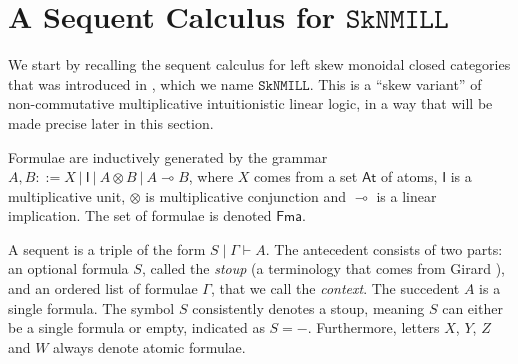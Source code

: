 \documentclass[sn-mathphys-num]{sn-jnl}%
\newcommand{\vd}{\vdash}
\newcommand{\ot}{\otimes}
\newcommand{\lolli}{\multimap}
\newcommand{\unit}{\mathsf{I}}
\newcommand{\SkNMILL}{$\mathtt{SkNMILL}$}
\newcommand{\SkBiCT}{$\mathtt{SkBiCT}$}
\newcommand{\SkBiCA}{$\mathtt{SkBiCA}$}
\newcommand{\mf}[1]{\mathsf{#1}}
\theoremstyle{thmstyleone}%
\theoremstyle{thmstyletwo}%
\theoremstyle{thmstylethree}%
\begin{document}

\section{A Sequent Calculus for \SkNMILL}\label{sec:syntax}
We start by recalling the sequent calculus for left skew monoidal closed categories that was introduced in \cite{UVW:protsn}, which we name \SkNMILL. This is a ``skew variant'' of non-commutative multiplicative intuitionistic linear logic, in a way that will be made precise later in this section.

Formulae are inductively generated by the grammar $A, B::= X \ | \ \unit \ | \ A \ot B \ | \ A \lolli B$, where $X$ comes from a set $\mathsf{At}$ of atoms, $\unit$ is a multiplicative unit, $\ot$ is multiplicative conjunction and $\lolli$ is a linear implication. The set of formulae is denoted $\mf{Fma}$.

A sequent is a triple of the form $S \mid \Gamma \vd A$. The antecedent consists of two parts: an optional formula $S$, called the \emph{stoup} (a terminology that comes from Girard \cite{girard:constructive:91}), and an ordered list of formulae $\Gamma$, that we call the \emph{context}. The succedent $A$ is a single formula.
The symbol $S$ consistently denotes a stoup, meaning $S$ can either be a single formula or empty, indicated as $S = {-}$. Furthermore, letters $X$, $Y$, $Z$ and $W$ always denote atomic formulae.
\end{document}
